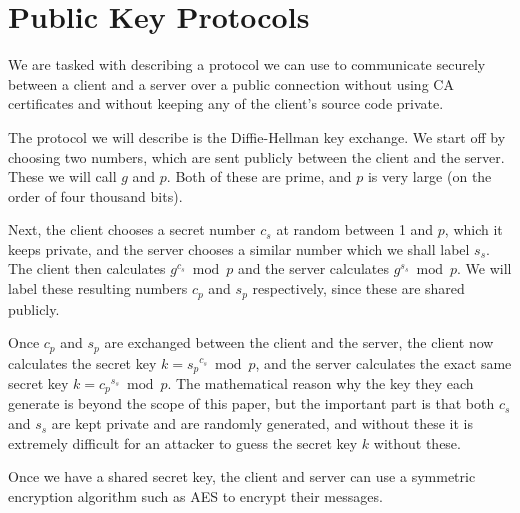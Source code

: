 \documentclass{article}
\begin{document}
\section{Public Key Protocols}

We are tasked with describing a protocol we can use to communicate securely between a client and a server over a public connection without using CA certificates and without keeping any of the client's source code private.

The protocol we will describe is the Diffie-Hellman key exchange. We start off by choosing two numbers, which are sent publicly between the client and the server. These we will call \(g\) and \(p\). Both of these are prime, and \(p\) is very large (on the order of four thousand bits).

Next, the client chooses a secret number \(c_s\) at random between 1 and \(p\), which it keeps private, and the server chooses a similar number which we shall label \(s_s\). The client then calculates \(g^{c_s} \bmod p\) and the server calculates \(g^{s_s} \bmod p\). We will label these resulting numbers \(c_p\) and \(s_p\) respectively, since these are shared publicly.

Once \(c_p\) and \(s_p\) are exchanged between the client and the server, the client now calculates the secret key \(k = {s_p}^{c_s} \bmod p\), and the server calculates the exact same secret key \(k = {c_p}^{s_s} \bmod p\). The mathematical reason why the key they each generate is beyond the scope of this paper, but the important part is that both \(c_s\) and \(s_s\) are kept private and are randomly generated, and without these it is extremely difficult for an attacker to guess the secret key \(k\) without these.

Once we have a shared secret key, the client and server can use a symmetric encryption algorithm such as AES to encrypt their messages.
\end{document}
